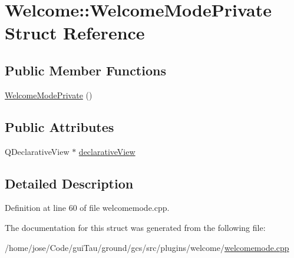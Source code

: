 \hypertarget{struct_welcome_1_1_welcome_mode_private}{\section{Welcome\-:\-:Welcome\-Mode\-Private Struct Reference}
\label{struct_welcome_1_1_welcome_mode_private}
}
\subsection*{Public Member Functions}
\begin{DoxyCompactItemize}
\item 
\hyperlink{group___welcome_plugin_ga75edcc8b045b7553f7bb09bde3a0a491}{Welcome\-Mode\-Private} ()
\end{DoxyCompactItemize}
\subsection*{Public Attributes}
\begin{DoxyCompactItemize}
\item 
Q\-Declarative\-View $\ast$ \hyperlink{group___welcome_plugin_gaf068be1c7d6cf926c50641b99392b563}{declarative\-View}
\end{DoxyCompactItemize}


\subsection{Detailed Description}


Definition at line 60 of file welcomemode.\-cpp.



The documentation for this struct was generated from the following file\-:\begin{DoxyCompactItemize}
\item 
/home/jose/\-Code/gui\-Tau/ground/gcs/src/plugins/welcome/\hyperlink{welcomemode_8cpp}{welcomemode.\-cpp}\end{DoxyCompactItemize}
